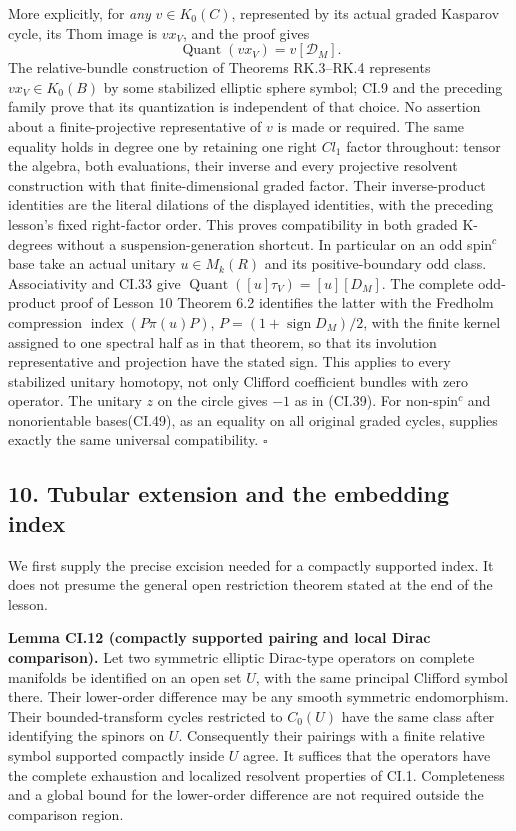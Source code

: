 \documentclass[
  11pt,
]{article}
\begin{document}
More explicitly, for \emph{any} \(v\in K_0(C)\), represented by its
actual graded Kasparov cycle, its Thom image is \(vx_V\), and the proof
gives \[
 \operatorname{Quant}(vx_V)=v[\mathscr D_M].
 \tag{CI.49}
\] The relative-bundle construction of Theorems RK.3--RK.4 represents
\(vx_V\in K_0(B)\) by some stabilized elliptic sphere symbol; CI.9 and
the preceding family prove that its quantization is independent of that
choice. No assertion about a finite-projective representative of \(v\)
is made or required. The same equality holds in degree one by retaining
one right \(Cl_1\) factor throughout: tensor the algebra, both
evaluations, their inverse and every projective resolvent construction
with that finite-dimensional graded factor. Their inverse-product
identities are the literal dilations of the displayed identities, with
the preceding lesson's fixed right-factor order. This proves
compatibility in both graded K-degrees without a suspension-generation
shortcut. In particular on an odd spin\(^{c}\) base take an actual
unitary \(u\in M_k(R)\) and its positive-boundary odd class.
Associativity and CI.33 give
\(\operatorname{Quant}([u]\tau_V)=[u][D_M]\). The complete odd-product
proof of Lesson 10 Theorem 6.2 identifies the latter with the Fredholm
compression \(\operatorname{index}(P\pi(u)P)\),
\(P=(1+\operatorname{sign}D_M)/2\), with the finite kernel assigned to
one spectral half as in that theorem, so that its involution
representative and projection have the stated sign. This applies to
every stabilized unitary homotopy, not only Clifford coefficient bundles
with zero operator. The unitary \(z\) on the circle gives \(-1\) as in
(CI.39). For non-spin\(^{c}\) and nonorientable bases(CI.49), as an
equality on all original graded cycles, supplies exactly the same
universal compatibility. \(\square\)

\subsection{10. Tubular extension and the embedding
index}\label{tubular-extension-and-the-embedding-index}

We first supply the precise excision needed for a compactly supported
index. It does not presume the general open restriction theorem stated
at the end of the lesson.

\textbf{Lemma CI.12 (compactly supported pairing and local Dirac
comparison).} Let two symmetric elliptic Dirac-type operators on
complete manifolds be identified on an open set \(U\), with the same
principal Clifford symbol there. Their lower-order difference may be any
smooth symmetric endomorphism. Their bounded-transform cycles restricted
to \(C_0(U)\) have the same class after identifying the spinors on
\(U\). Consequently their pairings with a finite relative symbol
supported compactly inside \(U\) agree. It suffices that the operators
have the complete exhaustion and localized resolvent properties of CI.1.
Completeness and a global bound for the lower-order difference are not
required outside the comparison region.
\end{document}
